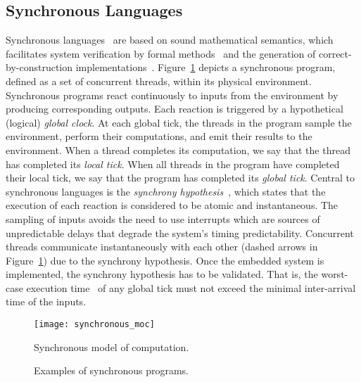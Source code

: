 \subsection{Synchronous Languages}
\label{sec:introduction:synchronous}

Synchronous languages~\cite{timed_synchronous_survey} 
are based on sound mathematical semantics, which facilitates 
system verification by formal methods~\cite{timed_synchronous_survey} and the
generation of correct-by-construction implementations~\cite{timed_cec,NataleZ12}.
Figure~\ref{fig:introduction:synchronous_moc} depicts a
synchronous program, defined as a set of concurrent threads,
within its physical environment. 
Synchronous programs react continuously to inputs from the environment 
by producing corresponding outputs. Each reaction is triggered by a 
hypothetical (logical) \emph{global clock}. At each global tick, the threads 
in the program sample the environment, perform their computations, and 
emit their results to the environment. When a thread completes its
computation, we say that the thread has completed its
\emph{local tick}. When all threads in the program have
completed their local tick, we say that the program has
completed its \emph{global tick}. Central to synchronous languages 
is the \emph{synchrony hypothesis}~\cite{timed_synchronous_survey}, 
which states that the execution of each reaction is considered to be 
atomic and instantaneous. 
The sampling of inputs avoids the need to use
interrupts which are sources of unpredictable delays that degrade the
system's timing predictability. Concurrent threads
communicate instantaneously with each other (dashed arrows in
Figure~\ref{fig:introduction:synchronous_moc}) due to the
synchrony hypothesis. Once the embedded system is
implemented, the synchrony hypothesis has to be validated.
That is, the worst-case execution time~\cite{wcet_methods_survey} 
of any global tick must not exceed the minimal inter-arrival 
time of the inputs.

\begin{figure}
	\centering
	\texttt{[image: synchronous\_moc]}	

	\caption{Synchronous model of computation.}
	\label{fig:introduction:synchronous_moc}
\end{figure}

\begin{figure}
	\centering

	\hfill

	\caption{Examples of synchronous programs.}
\end{figure}

